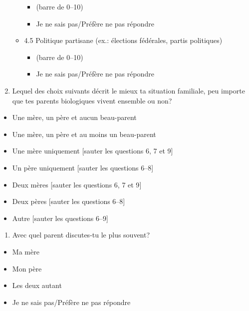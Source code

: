 \documentclass[
  letterpaper,
  DIV=11,
  numbers=noendperiod]{scrreprt}
\providecommand{\tightlist}{%
  \setlength{\itemsep}{0pt}\setlength{\parskip}{0pt}}\usepackage{longtable,booktabs,array}
\begin{document}
\begin{enumerate}
\begin{itemize}
    \begin{itemize}
    \tightlist
    \item
      (barre de 0--10)
    \item
      Je ne sais pas/Préfère ne pas répondre
    \end{itemize}
  \item
    4.5 Politique partisane (ex.: élections fédérales, partis
    politiques)

    \begin{itemize}
    \tightlist
    \item
      (barre de 0--10)
    \item
      Je ne sais pas/Préfère ne pas répondre
    \end{itemize}
  \end{itemize}
\item
  Lequel des choix suivants décrit le mieux ta situation familiale, peu
  importe que tes parents biologiques vivent ensemble ou non?
\end{enumerate}

\begin{itemize}
\tightlist
\item
  Une mère, un père et aucun beau-parent
\item
  Une mère, un père et au moins un beau-parent
\item
  Une mère uniquement {[}sauter les questions 6, 7 et 9{]}
\item
  Un père uniquement {[}sauter les questions 6--8{]}
\item
  Deux mères {[}sauter les questions 6, 7 et 9{]}
\item
  Deux pères {[}sauter les questions 6--8{]}
\item
  Autre {[}sauter les questions 6--9{]}
\end{itemize}

\begin{enumerate}
\def\labelenumi{\arabic{enumi}.}
\setcounter{enumi}{5}
\tightlist
\item
  Avec quel parent discutes-tu le plus souvent?
\end{enumerate}

\begin{itemize}
\tightlist
\item
  Ma mère
\item
  Mon père
\item
  Les deux autant
\item
  Je ne sais pas/Préfère ne pas répondre
\end{itemize}
\end{document}
